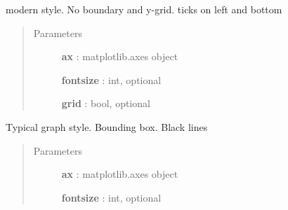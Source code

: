 \documentclass[letterpaper,10pt,english]{sphinxmanual}
\begin{document}

\begin{fulllineitems}
\label{pubplots:pubplots.plot.modern_style}
modern style. No boundary and y-grid. ticks on left and bottom
\begin{quote}\begin{description}
\item[{Parameters}] \leavevmode
\textbf{ax} : matplotlib.axes object

\textbf{fontsize} : int, optional

\textbf{grid} : bool, optional

\end{description}\end{quote}

\end{fulllineitems}


\begin{fulllineitems}
\label{pubplots:pubplots.plot.old_hat_style}
Typical graph style. Bounding box. Black lines
\begin{quote}\begin{description}
\item[{Parameters}] \leavevmode
\textbf{ax} : matplotlib.axes object

\textbf{fontsize} : int, optional

\end{description}\end{quote}

\end{fulllineitems}

\end{document}
